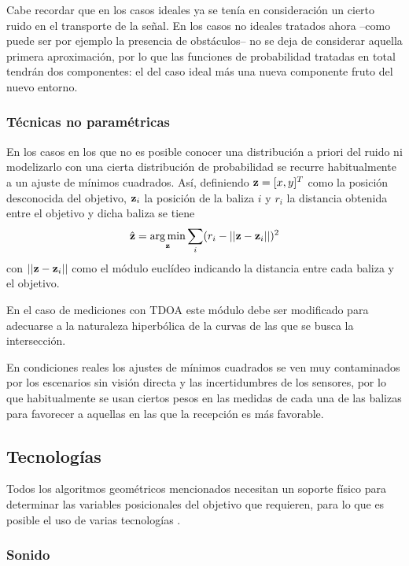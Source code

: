 Cabe recordar que en los casos ideales ya se tenía en consideración un cierto ruido en el transporte de la señal.
En los casos no ideales tratados ahora --como puede ser por ejemplo la presencia de obstáculos-- no se deja de considerar aquella primera aproximación, por lo que las funciones de probabilidad tratadas en total tendrán dos componentes: el del caso ideal más una nueva componente fruto del nuevo entorno.

\subsubsection{Técnicas no paramétricas}

En los casos en los que no es posible conocer una distribución a priori del ruido ni modelizarlo con una cierta distribución de probabilidad se recurre habitualmente a un ajuste de mínimos cuadrados.
Así, definiendo $\vb{z} = [x,y]^T$ como la posición desconocida del objetivo, $\vb{z}_i$ la posición de la baliza $i$ y $r_i$ la distancia obtenida entre el objetivo y dicha baliza se tiene \cite{MAIN}
\begin{equation}
    \hat{\vb{z}} = \operatorname*{arg\,min}_{\vb{z}} \sum_i(r_i - ||\vb{z} - \vb{z}_i||)^2
\end{equation}
con $||\vb{z} - \vb{z}_i||$ como el módulo euclídeo indicando la distancia entre cada baliza y el objetivo.

En el caso de mediciones con TDOA este módulo debe ser modificado para adecuarse a la naturaleza hiperbólica de la curvas de las que se busca la intersección.

En condiciones reales los ajustes de mínimos cuadrados se ven muy contaminados por los escenarios sin visión directa y las incertidumbres de los sensores, por lo que habitualmente se usan ciertos pesos en las medidas de cada una de las balizas para favorecer a aquellas en las que la recepción es más favorable.

\subsection{Tecnologías}

Todos los algoritmos geométricos mencionados necesitan un soporte físico para determinar las variables posicionales del objetivo que requieren, para lo que es posible el uso de varias tecnologías \cite{COMP}.

\subsubsection{Sonido}

